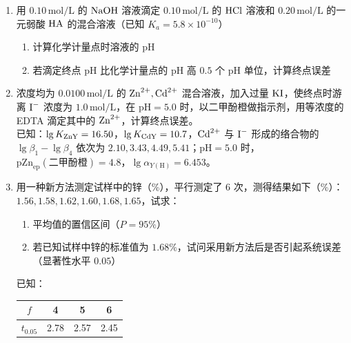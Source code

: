 \begin{enumerate}[label=\arabic*., itemsep=1.5ex]
    \item 用 $0.10\,\text{mol/L}$ 的 $\ce{NaOH}$ 溶液滴定 $0.10\,\text{mol/L}$ 的 $\ce{HCl}$ 溶液和 $0.20\,\text{mol/L}$ 的一元弱酸 $\ce{HA}$ 的混合溶液（已知 $K_a=5.8\times10^{-10}$）
    \begin{enumerate}[label=(\arabic*), noitemsep, topsep=0pt, partopsep=0pt]
        \item 计算化学计量点时溶液的 $\text{pH}$
        \item 若滴定终点 $\text{pH}$ 比化学计量点的 $\text{pH}$ 高 $0.5$ 个 $\text{pH}$ 单位，计算终点误差
    \end{enumerate}
    \item 浓度均为 $0.0100\,\text{mol/L}$ 的 $\ce{Zn^{2+}, Cd^{2+}}$ 混合溶液，加入过量 $\ce{KI}$，使终点时游离 $\ce{I^-}$ 浓度为 $1.0\,\text{mol/L}$，在 $\text{pH}=5.0$ 时，以二甲酚橙做指示剂，用等浓度的 EDTA 滴定其中的 $\ce{Zn^{2+}}$，计算终点误差。
    \\
    已知：$\lg K_{\ce{ZnY}}=16.50$，$\lg K_{\ce{CdY}}=10.7$，$\ce{Cd^{2+}}$ 与 $\ce{I^-}$ 形成的络合物的 $\lg\beta_1-\lg\beta_4$ 依次为 $2.10, 3.43, 4.49, 5.41$；$\text{pH}=5.0$ 时，$\text{pZn}_{\text{ep}}(\text{二甲酚橙})=4.8$，$\lg\alpha_{Y(\text{H})}=6.453$。
    \item 用一种新方法测定试样中的锌（\%），平行测定了 6 次，测得结果如下（\%）：$1.56, 1.58, 1.62, 1.60, 1.68, 1.65$，试求：
    \begin{enumerate}[label=(\arabic*), noitemsep, topsep=0pt, partopsep=0pt]
        \item 平均值的置信区间（$P=95\%$）
        \item 若已知试样中锌的标准值为 $1.68\%$，试问采用新方法后是否引起系统误差（显著性水平 $0.05$）
    \end{enumerate}

    已知：
    \begin{center}
    \begin{tabular}{|c|c|c|c|}
    \hline
    $f$ & 4 & 5 & 6 \\
    \hline
    $t_{0.05}$ & 2.78 & 2.57 & 2.45 \\
    \hline
    \end{tabular}
    \end{center}
\end{enumerate}